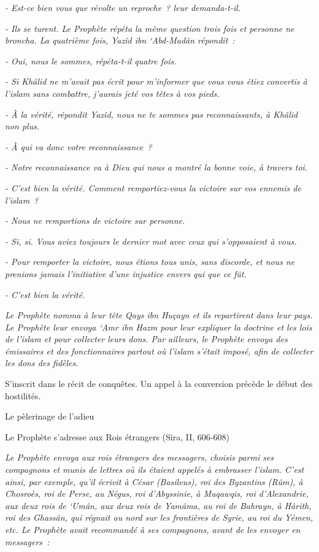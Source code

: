 \emph{- Est-ce bien vous que révolte un reproche~? leur demanda-t-il.}

\emph{- Ils se turent. Le Prophète répéta la même question trois fois et
personne ne broncha. La quatrième fois, Yazîd ibn `Abd-Madân répondit~:}

\emph{- Oui, nous le sommes, répéta-t-il quatre fois.}

\emph{- Si Khâlid ne m'avait pas écrit pour m'informer que vous vous
étiez convertis à l'islam sans combattre, j'aurais jeté vos têtes à vos
pieds.}

\emph{- À la vérité, répondit Yazîd, nous ne te sommes pas
reconnaissants, à Khâlid non plus.}

\emph{- À qui va donc votre reconnaissance~?}

\emph{- Notre reconnaissance va à Dieu qui nous a montré la bonne voie,
à travers toi.}

\emph{- C'est bien la vérité. Comment remportiez-vous la victoire sur
vos ennemis de l'islam~?}

\emph{- Nous ne remportions de victoire sur personne.}

\emph{- Si, si. Vous aviez toujours le dernier mot avec ceux qui
s'opposaient à vous.}

\emph{- Pour remporter la victoire, nous étions tous unis, sans
discorde, et nous ne prenions jamais l'initiative d'une injustice envers
qui que ce fût.}

\emph{- C'est bien la vérité.}

\emph{Le Prophète nomma à leur tête Qays ibn Huçayn et ils repartirent
dans leur pays. Le Prophète leur envoya `Amr ibn Hazm pour leur
expliquer la doctrine et les lois de l'islam et pour collecter leurs
dons. Par ailleurs, le Prophète envoya des émissaires et des
fonctionnaires partout où l'islam s'était imposé, afin de collecter les
dons des fidèles.}

S'inscrit dans le récit de conquêtes. Un appel à la conversion précède
le début des hostilités.


Le pèlerinage de l'adieu

Le Prophète s'adresse aux Rois étrangers (Sīra, II, 606-608)

\emph{Le Prophète envoya aux rois étrangers des messagers, choisis parmi
ses compagnons et munis de lettres où ils étaient appelés à embrasser
l'islam. C'est ainsi, par exemple, qu'il écrivit à César (Basileus), roi
des Byzantins (Rûm), à Chosroès, roi de Perse, au Négus, roi
d'Abyssinie, à Muqawqis, roi d'Alexandrie, aux deux rois de `Umân, aux
deux rois de Yamâma, au roi de Bahrayn, à Hârith, roi des Ghassân, qui
régnait au nord sur les frontières de Syrie, au roi du Yémen, etc. Le
Prophète avait recommandé à ses compagnons, avant de les envoyer en
messagers~:}

